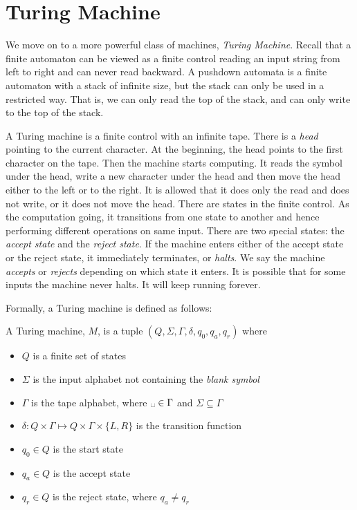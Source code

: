 \documentclass[11pt]{article}
\begin{document}
\section{Turing Machine}

We move on to a more powerful class of machines, \emph{Turing Machine}. Recall that a finite
automaton can be viewed as a finite control reading an input string from left to right and can never
read backward. A pushdown automata is a finite automaton with a stack of infinite size, but the
stack can only be used in a restricted way. That is, we can only read the top of the stack, and can
only write to the top of the stack.

A Turing machine is a finite control with an infinite tape. There is a \emph{head} pointing to the
current character. At the beginning, the head points to the first character on the tape. Then the
machine starts computing. It reads the symbol under the head, write a new character under the head
and then move the head either to the left or to the right. It is allowed that it does only the read
and does not write, or it does not move the head. There are states in the finite control. As the
computation going, it transitions from one state to another and hence performing different
operations on same input. There are two special states: the \emph{accept state} and the
\emph{reject state}. If the machine enters either of the accept state or the reject state, it
immediately terminates, or \emph{halts}. We say the machine \emph{accepts} or \emph{rejects}
depending on which state it enters. It is possible that for some inputs the machine never halts. It
will keep running forever.

Formally, a Turing machine is defined as follows:
\begin{definition}
A Turing machine, $M$, is a tuple $(Q,\Sigma,\Gamma,\delta,q_0,q_a,q_r)$ where
\begin{itemize}
\item $Q$ is a finite set of states
\item $\Sigma$ is the input alphabet not containing the \emph{blank symbol \textvisiblespace}
\item $\Gamma$ is the tape alphabet, where $\text{\textvisiblespace} \in \Gamma$ and $\Sigma
\subseteq \Gamma$
\item $\delta : Q \times \Gamma \mapsto Q \times \Gamma \times \{L,R\}$ is the transition function
\item $q_0 \in Q$ is the start state
\item $q_a \in Q$ is the accept state
\item $q_r \in Q$ is the reject state, where $q_a \neq q_r$
\end{itemize}
\end{definition}
\end{document}
